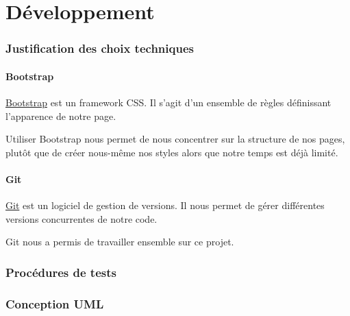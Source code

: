 \part{Développement}
\section{Justification des choix techniques}

	\subsection{Bootstrap}

		\href{http://getbootstrap.com/}{Bootstrap} est un framework CSS. Il s'agit d'un ensemble de règles définissant l'apparence de notre page.

		Utiliser Bootstrap nous permet de nous concentrer sur la structure de nos pages, plutôt que de créer nous-même nos styles alors que notre temps est déjà limité.

	\subsection{Git}

		\href{http://git-scm.com/}{Git} est un logiciel de gestion de versions. Il nous permet de gérer différentes versions concurrentes de notre code.

		Git nous a permis de travailler ensemble sur ce projet.

\section{Procédures de tests}
\clearpage
\section{Conception UML}
